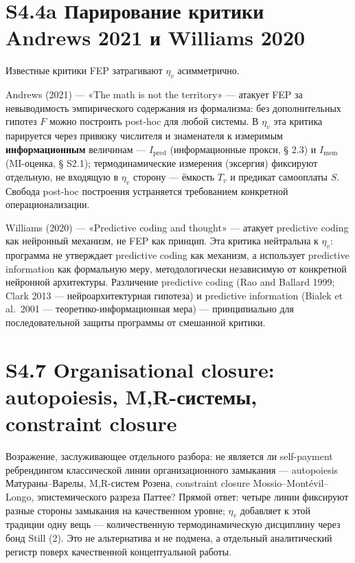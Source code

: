 \documentclass[pdflatex,sn-mathphys-ay]{sn-jnl}
\begin{document}
\section*{S4.4a Парирование критики Andrews 2021 и Williams 2020}\label{s4.4a-ux43fux430ux440ux438ux440ux43eux432ux430ux43dux438ux435-ux43aux440ux438ux442ux438ux43aux438-andrews-2021-ux438-williams-2020}

Известные критики FEP затрагивают \(\eta_v\) асимметрично.

Andrews (2021) --- «The math is not the territory» --- атакует FEP за невыводимость эмпирического содержания из формализма: без дополнительных гипотез \(F\) можно построить post-hoc для любой системы. В \(\eta_v\) эта критика парируется через привязку числителя и знаменателя к измеримым \textbf{информационным} величинам --- \(I_{\text{pred}}\) (информационные прокси, § 2.3) и \(I_{\text{mem}}\) (MI-оценка, § S2.1); термодинамические измерения (эксергия) фиксируют отдельную, не входящую в \(\eta_v\) сторону --- ёмкость \(T_v\) и предикат самооплаты \(S\). Свобода post-hoc построения устраняется требованием конкретной операционализации.

Williams (2020) --- «Predictive coding and thought» --- атакует predictive coding как нейронный механизм, не FEP как принцип. Эта критика нейтральна к \(\eta_v\): программа не утверждает predictive coding как механизм, а использует predictive information как формальную меру, методологически независимую от конкретной нейронной архитектуры. Различение predictive coding (Rao and Ballard 1999; Clark 2013 --- нейроархитектурная гипотеза) и predictive information (Bialek et al.~2001 --- теоретико-информационная мера) --- принципиально для последовательной защиты программы от смешанной критики.

\section*{S4.7 Organisational closure: autopoiesis, M,R-системы, constraint closure}\label{s4.7-organisational-closure-autopoiesis-mr-ux441ux438ux441ux442ux435ux43cux44b-constraint-closure}

Возражение, заслуживающее отдельного разбора: не является ли self-payment ребрендингом классической линии организационного замыкания --- autopoiesis Матураны--Варелы, M,R-систем Розена, constraint closure Mossio--Montévil--Longo, эпистемического разреза Паттее? Прямой ответ: четыре линии фиксируют разные стороны замыкания на качественном уровне; \(\eta_v\) добавляет к этой традиции одну вещь --- количественную термодинамическую дисциплину через бонд Still (2). Это не альтернатива и не подмена, а отдельный аналитический регистр поверх качественной концептуальной работы.
\end{document}
